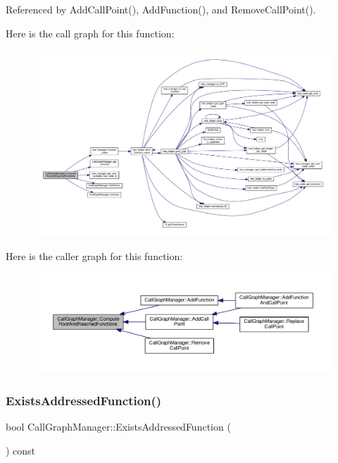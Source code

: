 Referenced by Add\+Call\+Point(), Add\+Function(), and Remove\+Call\+Point().

Here is the call graph for this function\+:
\nopagebreak
\begin{figure}[H]
\begin{center}
\leavevmode
\includegraphics[width=350pt]{d5/d96/classCallGraphManager_abcbe2ee2364242c09a811a07139f10fb_cgraph}
\end{center}
\end{figure}
Here is the caller graph for this function\+:
\nopagebreak
\begin{figure}[H]
\begin{center}
\leavevmode
\includegraphics[width=350pt]{d5/d96/classCallGraphManager_abcbe2ee2364242c09a811a07139f10fb_icgraph}
\end{center}
\end{figure}
\mbox{\label{classCallGraphManager_ae5a29d3415ff94c66e96912328b871d7}} 
\subsubsection{\texorpdfstring{Exists\+Addressed\+Function()}{ExistsAddressedFunction()}}
{\footnotesize\ttfamily bool Call\+Graph\+Manager\+::\+Exists\+Addressed\+Function (\begin{DoxyParamCaption}{ }\end{DoxyParamCaption}) const}



